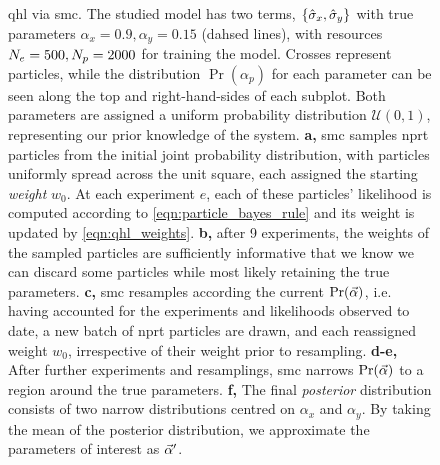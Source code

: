 \begin{figure}
{    }
    \hspace{0mm}
    \caption[Quantum Hamiltonian learning via sequential Monte Carlo]{
        \Acrfull{qhl} via \acrfull{smc}. 
        The studied model has two terms, $\{\hat{\sigma}_{x}, \hat{\sigma}_{y}\}$ with true parameters $\alpha_{x}=0.9, \alpha_y=0.15$ (dahsed lines), 
            with resources $N_e=500, N_p=2000$ for training the model. 
        Crosses represent \glspl{particle}, while the distribution $\Pr(\alpha_p)$ for each 
            parameter can be seen along the top and right-hand-sides of each subplot. 
        Both parameters are assigned a uniform probability distribution $\mathcal{U}(0,1)$, representing our prior knowledge of the system. 
        \textbf{a,} \gls{smc} samples \gls{nprt} \glspl{particle} from the initial joint probability distribution, 
            with \glspl{particle} uniformly spread across the unit square, each assigned the starting \emph{weight} $w_0$. 
            At each \gls{experiment} $e$, each of these \glspl{particle}' \gls{likelihood} is computed according to \cref{eqn:particle_bayes_rule}
            and its weight is updated by \cref{eqn:qhl_weights}.
        \textbf{b,} after 9 \glspl{experiment}, the weights of the sampled \glspl{particle} are sufficiently informative that we know we can 
            discard some \glspl{particle} while most likely retaining the true parameters. 
        \textbf{c,} \gls{smc} resamples according the current $\Pr(\vec{\alpha})$, 
            i.e. having accounted for the \glspl{experiment} and \glspl{likelihood}  observed to date, 
            a new batch of \gls{nprt} \glspl{particle} are drawn, and each reassigned weight $w_0$, 
            irrespective of their weight prior to resampling.  
        \textbf{d-e,} After further \glspl{experiment} and resamplings, \gls{smc} narrows $\Pr(\vec{\alpha})$ to a region around the true parameters. 
        \textbf{f,} The final \emph{posterior} distribution consists of two narrow distributions centred on $\alpha_x$ and $\alpha_y$. 
        By taking the mean of the posterior distribution, we approximate the parameters of interest as $\vec{\alpha}^{\prime}$. 
    }
    \label{fig:qhl_smc}
\end{figure}



